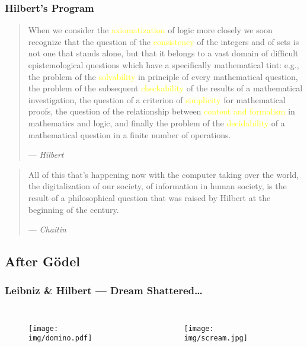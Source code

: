 \documentclass[UTF8,11pt,colorlinks,compress,openany]{beamer}%
\begin{document}
\begin{frame}\frametitle{Hilbert's Program}
	\begin{quote}
		{\small When we consider the \textcolor{yellow}{axiomatization} of logic more closely we soon recognize that the question of the \textcolor{yellow}{consistency} of the integers and of sets is not one that stands alone, but that it belongs to a vast domain of difficult epistemological questions which have a specifically mathematical tint: e.g., the problem of the \textcolor{yellow}{solvability} in principle of every mathematical question, the problem of the subsequent \textcolor{yellow}{checkability} of the results of a mathematical investigation, the question of a criterion of \textcolor{yellow}{simplicity} for mathematical proofs, the question of the relationship between \textcolor{yellow}{content and formalism} in mathematics and logic, and finally the problem of the \textcolor{yellow}{decidability} of a mathematical question in a finite number of operations.\par
			\hfill --- \textsl{Hilbert}}
	\end{quote}
	\begin{quote}
		{\small All of this that's happening now with the computer taking over the world, the digitalization of our society, of information in human society, is the result of a philosophical question that was raised by Hilbert at the beginning of the century.\par\hfill --- \textsl{Chaitin}}
	\end{quote}
\end{frame}

\subsection{After G\"odel}

\begin{frame}\frametitle{Leibniz \& Hilbert --- Dream Shattered\dots}
\begin{columns}
	\begin{figure}
		\texttt{[image: img/domino.pdf]}
	\end{figure}
	\begin{figure}
		\texttt{[image: img/scream.jpg]}
	\end{figure}
\end{columns}
\end{frame}
\end{document}
